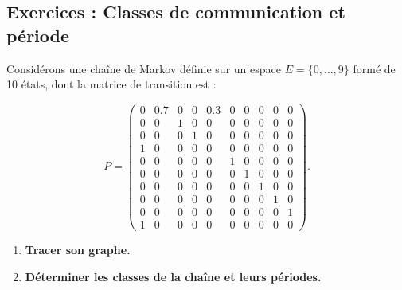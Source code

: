 \subsection{Exercices : Classes de communication et période}
\begin{exercise}[7.3]
Considérons une chaîne de Markov définie sur un espace $E = \{0, \dots, 9\}$ formé de 10 états, dont la matrice de transition est :

\[
P =
\begin{pmatrix}
0 & 0.7 & 0 & 0 & 0.3 & 0 & 0 & 0 & 0 & 0 \\
0 & 0 & 1 & 0 & 0 & 0 & 0 & 0 & 0 & 0 \\
0 & 0 & 0 & 1 & 0 & 0 & 0 & 0 & 0 & 0 \\
1 & 0 & 0 & 0 & 0 & 0 & 0 & 0 & 0 & 0 \\
0 & 0 & 0 & 0 & 0 & 1 & 0 & 0 & 0 & 0 \\
0 & 0 & 0 & 0 & 0 & 0 & 1 & 0 & 0 & 0 \\
0 & 0 & 0 & 0 & 0 & 0 & 0 & 1 & 0 & 0 \\
0 & 0 & 0 & 0 & 0 & 0 & 0 & 0 & 1 & 0 \\
0 & 0 & 0 & 0 & 0 & 0 & 0 & 0 & 0 & 1 \\
1 & 0 & 0 & 0 & 0 & 0 & 0 & 0 & 0 & 0
\end{pmatrix}.
\]

\begin{enumerate}
    \item \textbf{Tracer son graphe.}
    \item \textbf{Déterminer les classes de la chaîne et leurs périodes.}
\end{enumerate}
\end{exercise}


